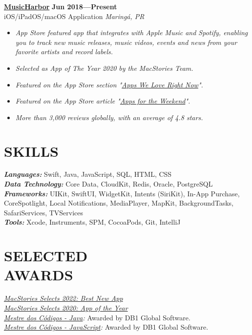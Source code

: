 \documentclass[line,margin]{res}
\begin{document}
\begin{resume}
  {\bf \href{https://apps.apple.com/us/app/musicharbor/id1440405750}{MusicHarbor}} \hfill {\bf Jun 2018---Present} \\
  iOS/iPadOS/macOS Application \hfill {\sl Maring\'a, PR}\\[-6pt]
    \begin{itemize}
    \item {\sl App Store featured app that integrates with Apple Music and Spotify, enabling you to track new music releases, music videos, events and news from your favorite artists and record labels.}
    \item {\sl Selected as App of The Year 2020 by the MacStories Team.}
    \item {\sl Featured on the App Store section "\href{https://github.com/marcosatanaka/resume-latex/blob/master/images/apps_we_love_right_now.png?raw=true}{Apps We Love Right Now}".}
    \item {\sl Featured on the App Store article "\href{https://apps.apple.com/us/story/id1516537723}{Apps for the Weekend}".}
    \item {\sl More than 3,000 reviews globally,  with an average of 4.8 stars.}
    \end{itemize}


\section{SKILLS}
  {\sl {\bf Languages:}} Swift, Java, JavaScript, SQL, HTML, CSS \\
  {\sl {\bf Data Technology:}} Core Data, CloudKit, Redis, Oracle, PostgreSQL \\
  {\sl {\bf Frameworks:}} UIKit, SwiftUI, WidgetKit, Intents (SiriKit), In-App Purchase, CoreSpotlight, Local Notifications, MediaPlayer, MapKit, BackgroundTasks, SafariServices, TVServices \\
  {\sl {\bf Tools:}} Xcode, Instruments, SPM, CocoaPods, Git, IntelliJ


\section{SELECTED \\ AWARDS}             
  {\sl \href{https://www.macstories.net/stories/macstories-selects-2022-recognizing-the-best-apps-of-the-year/#best-new-app}{MacStories Selects 2022: Best New App}}\\
  {\sl \href{https://www.macstories.net/stories/macstories-selects-2020-recognizing-the-best-apps-of-the-year/#app-of-the-year}{MacStories Selects 2020: App of the Year}}\\
  {\sl \href{https://mestredoscodigos.com.br/primeira-entrega-dos-pins-do-mestre-dos-codigos}{Mestre dos C\'odigos - Java}:} Awarded by DB1 Global Software.\\
  {\sl \href{https://mestredoscodigos.com.br/primeira-entrega-dos-pins-do-mestre-dos-codigos}{Mestre dos C\'odigos - JavaScript}:} Awarded by DB1 Global Software.\\
 

\end{resume}
\end{document}
